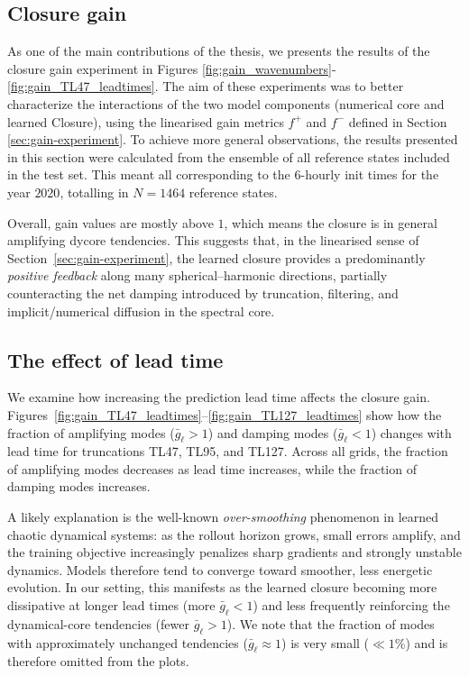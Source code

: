 \subsection{Closure gain}
As one of the main contributions of the thesis, we presents the results of the closure gain experiment in Figures \ref{fig:gain_wavenumbers}-\ref{fig:gain_TL47_leadtimes}. The aim of these experiments was to better characterize the interactions of the two model components (numerical core and learned Closure), using the linearised gain metrics $f^{+}$ and $f^{-}$ defined in Section \ref{sec:gain-experiment}. To achieve more general observations, the results presented in this section were calculated from the ensemble of all reference states included in the test set. This meant all corresponding to the $6$-hourly init times for the year $2020$, totalling in $N=1464$ reference states.

Overall, gain values are mostly above $1$, which means the closure is in general amplifying dycore tendencies. This suggests that, in the linearised sense of Section~\ref{sec:gain-experiment}, the learned closure provides a predominantly \emph{positive feedback} along many spherical–harmonic directions, partially counteracting the net damping introduced by truncation, filtering, and implicit/numerical diffusion in the spectral core.

\subsection{The effect of lead time}
We examine how increasing the prediction lead time affects the closure gain. Figures~\ref{fig:gain_TL47_leadtimes}--\ref{fig:gain_TL127_leadtimes} show how the fraction of amplifying modes (\(\bar{g}_\ell > 1\)) and damping modes (\(\bar{g}_\ell < 1\)) changes with lead time for truncations TL47, TL95, and TL127. Across all grids, the fraction of amplifying modes decreases as lead time increases, while the fraction of damping modes increases.

A likely explanation is the well-known \emph{over-smoothing} phenomenon in learned chaotic dynamical systems: as the rollout horizon grows, small errors amplify, and the training objective increasingly penalizes sharp gradients and strongly unstable dynamics. Models therefore tend to converge toward smoother, less energetic evolution. In our setting, this manifests as the learned closure becoming more dissipative at longer lead times (more \(\bar{g}_\ell < 1\)) and less frequently reinforcing the dynamical-core tendencies (fewer \(\bar{g}_\ell > 1\)). We note that the fraction of modes with approximately unchanged tendencies (\(\bar{g}_\ell \approx 1\)) is very small (\(\ll 1\%\)) and is therefore omitted from the plots.

